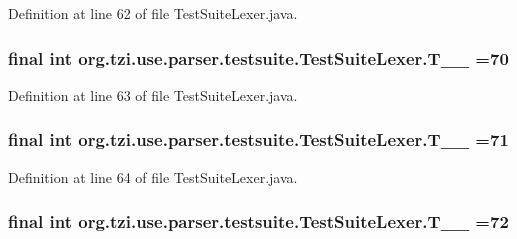 Definition at line 62 of file Test\-Suite\-Lexer.\-java.

\hypertarget{classorg_1_1tzi_1_1use_1_1parser_1_1testsuite_1_1_test_suite_lexer_a25aec54fec1907a49bdfb8ec7a421ce6}{
\subsubsection[{T\-\_\-\-\_\-70}]{\setlength{\rightskip}{0pt plus 5cm}final int org.\-tzi.\-use.\-parser.\-testsuite.\-Test\-Suite\-Lexer.\-T\-\_\-\-\_ =70\hspace{0.3cm}{\ttfamily [static]}}}\label{classorg_1_1tzi_1_1use_1_1parser_1_1testsuite_1_1_test_suite_lexer_a25aec54fec1907a49bdfb8ec7a421ce6}


Definition at line 63 of file Test\-Suite\-Lexer.\-java.

\hypertarget{classorg_1_1tzi_1_1use_1_1parser_1_1testsuite_1_1_test_suite_lexer_a22e6dc821cd928015d661321ffebe1d3}{
\subsubsection[{T\-\_\-\-\_\-71}]{\setlength{\rightskip}{0pt plus 5cm}final int org.\-tzi.\-use.\-parser.\-testsuite.\-Test\-Suite\-Lexer.\-T\-\_\-\-\_ =71\hspace{0.3cm}{\ttfamily [static]}}}\label{classorg_1_1tzi_1_1use_1_1parser_1_1testsuite_1_1_test_suite_lexer_a22e6dc821cd928015d661321ffebe1d3}


Definition at line 64 of file Test\-Suite\-Lexer.\-java.

\hypertarget{classorg_1_1tzi_1_1use_1_1parser_1_1testsuite_1_1_test_suite_lexer_aec6b3c5935798cad12888f831284eb2a}{
\subsubsection[{T\-\_\-\-\_\-72}]{\setlength{\rightskip}{0pt plus 5cm}final int org.\-tzi.\-use.\-parser.\-testsuite.\-Test\-Suite\-Lexer.\-T\-\_\-\-\_ =72\hspace{0.3cm}{\ttfamily [static]}}}\label{classorg_1_1tzi_1_1use_1_1parser_1_1testsuite_1_1_test_suite_lexer_aec6b3c5935798cad12888f831284eb2a}


